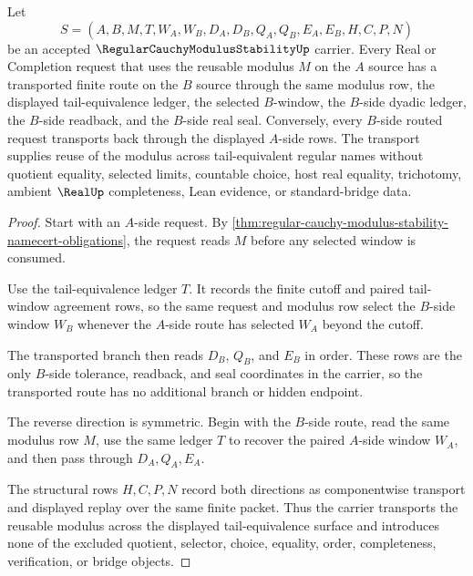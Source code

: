 \begin{theorem}
\label{thm:regular-cauchy-modulus-stability-tail-equivalence-transport}
Let
$$
S=(A,B,M,T,W_A,W_B,D_A,D_B,Q_A,Q_B,E_A,E_B,H,C,P,N)
$$
be an accepted $\RegularCauchyModulusStabilityUp$ carrier. Every Real or Completion request that uses the reusable modulus $M$ on the $A$ source has a transported finite route on the $B$ source through the same modulus row, the displayed tail-equivalence ledger, the selected $B$-window, the $B$-side dyadic ledger, the $B$-side readback, and the $B$-side real seal. Conversely, every $B$-side routed request transports back through the displayed $A$-side rows. The transport supplies reuse of the modulus across tail-equivalent regular names without quotient equality, selected limits, countable choice, host real equality, trichotomy, ambient $\RealUp$ completeness, Lean evidence, or standard-bridge data.
\end{theorem}
\begin{proof}
Start with an $A$-side request. By \autoref{thm:regular-cauchy-modulus-stability-namecert-obligations}, the request reads $M$ before any selected window is consumed.

Use the tail-equivalence ledger $T$. It records the finite cutoff and paired tail-window agreement rows, so the same request and modulus row select the $B$-side window $W_B$ whenever the $A$-side route has selected $W_A$ beyond the cutoff.

The transported branch then reads $D_B$, $Q_B$, and $E_B$ in order. These rows are the only $B$-side tolerance, readback, and seal coordinates in the carrier, so the transported route has no additional branch or hidden endpoint.

The reverse direction is symmetric. Begin with the $B$-side route, read the same modulus row $M$, use the same ledger $T$ to recover the paired $A$-side window $W_A$, and then pass through $D_A,Q_A,E_A$.

The structural rows $H,C,P,N$ record both directions as componentwise transport and displayed replay over the same finite packet. Thus the carrier transports the reusable modulus across the displayed tail-equivalence surface and introduces none of the excluded quotient, selector, choice, equality, order, completeness, verification, or bridge objects.
\end{proof}



